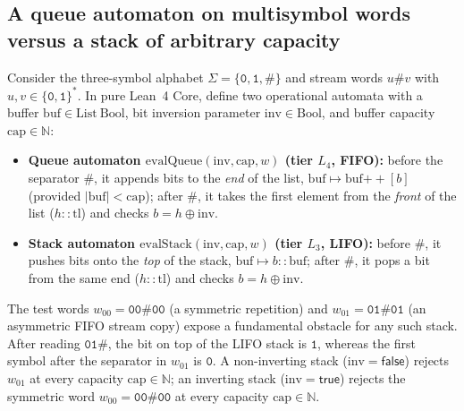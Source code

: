 \documentclass[11pt,a4paper]{article}
\theoremstyle{cleanthm}
\begin{document}
\subsection{A queue automaton on multisymbol words versus a stack of arbitrary capacity}
Consider the three-symbol alphabet $\Sigma=\{\mathtt{0},\mathtt{1},\mathtt{\#}\}$ and stream words $u\mathtt{\#}v$ with $u,v\in\{\mathtt{0},\mathtt{1}\}^*$. In pure Lean~4 Core, define two operational automata with a buffer $\mathrm{buf}\in\mathrm{List\ Bool}$, bit inversion parameter $\mathrm{inv}\in\mathrm{Bool}$, and buffer capacity $\mathrm{cap}\in\mathbb N$:
\begin{itemize}
\item \textbf{Queue automaton $\mathrm{evalQueue}(\mathrm{inv},\mathrm{cap},w)$ (tier $L_4$, FIFO):} before the separator $\mathtt{\#}$, it appends bits to the \emph{end} of the list, $\mathrm{buf}\mapsto\mathrm{buf}\mathbin{+\!+}[b]$ (provided $|\mathrm{buf}|<\mathrm{cap}$); after $\mathtt{\#}$, it takes the first element from the \emph{front} of the list ($h::\mathrm{tl}$) and checks $b=h\oplus\mathrm{inv}$.
\item \textbf{Stack automaton $\mathrm{evalStack}(\mathrm{inv},\mathrm{cap},w)$ (tier $L_3$, LIFO):} before $\mathtt{\#}$, it pushes bits onto the \emph{top} of the stack, $\mathrm{buf}\mapsto b::\mathrm{buf}$; after $\mathtt{\#}$, it pops a bit from the same end ($h::\mathrm{tl}$) and checks $b=h\oplus\mathrm{inv}$.
\end{itemize}
The test words $w_{00}=\mathtt{00\#00}$ (a symmetric repetition) and $w_{01}=\mathtt{01\#01}$ (an asymmetric FIFO stream copy) expose a fundamental obstacle for any such stack. After reading $\mathtt{01\#}$, the bit on top of the LIFO stack is $\mathtt{1}$, whereas the first symbol after the separator in $w_{01}$ is $\mathtt{0}$. A non-inverting stack ($\mathrm{inv}=\mathsf{false}$) rejects $w_{01}$ at every capacity $\mathrm{cap}\in\mathbb N$; an inverting stack ($\mathrm{inv}=\mathsf{true}$) rejects the symmetric word $w_{00}=\mathtt{00\#00}$ at every capacity $\mathrm{cap}\in\mathbb N$.
\end{document}
